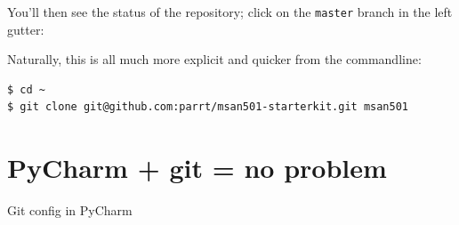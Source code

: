\documentclass[titlepage]{tufte-book}
\newcounter{problem}
\begin{document}
You'll then see the status of the repository; click on the {\tt master} branch in the left gutter:
\vspace{5mm}


Naturally, this is all much more explicit and quicker from the commandline:

\begin{lstlisting}[style=BashInputStyle]
$ cd ~
$ git clone git@github.com:parrt/msan501-starterkit.git msan501
\end{lstlisting}

\section{PyCharm + git = no problem}

\begin{marginfigure}[1in]
\begin{center}
\end{center}
\caption{Git config in PyCharm}
\end{marginfigure}
\end{document}
